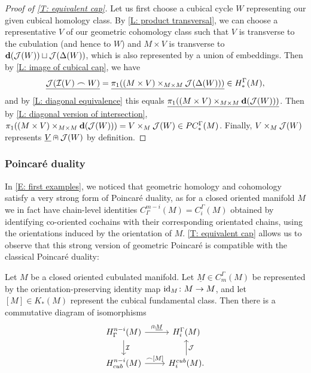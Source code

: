 \begin{proof}[Proof of \cref{T: equivalent cap}]
	Let us first choose a cubical cycle $W$ representing our given cubical homology class.
	By \cref{L: product transversal}, we can choose a representative $V$ of our geometric cohomology class such that $V$ is transverse to the cubulation (and hence to $W$) and $M \times V$ is transverse to $\mathbf{d}(\mathcal{J}(W)) \sqcup \mathcal{J}(\Delta(W))$, which is also represented by a union of embeddings.
	Then by \cref{L: image of cubical cap}, we have
	$$\underline{\mathcal{J}(\mathcal{I}(V)\frown W)} = \underline{\pi_1( (M \times V)\times_{M \times M}\mathcal{J}(\Delta(W)))} \in H_*^\Gamma(M),$$
	and by \cref{L: diagonal equivalence} this equals $\underline{\pi_1((M \times V)\times_{M \times M} \mathbf{d}(\mathcal{J}(W)))}$.
	Then by \cref{L: diagonal version of intersection},
	$\pi_1((M \times V)\times_{M \times M} \mathbf{d}(\mathcal{J}(W))) = V \times_M \mathcal{J}(W) \in PC_*^\Gamma(M)$.
	Finally, $V \times_M \mathcal{J}(W)$ represents $\underline{V}\nplus \mathcal{J}(W)$ by definition.
\end{proof}

\subsubsection{Poincar\'e duality}\label{S: PD}

In \cref{E: first examples}, we noticed that geometric homology and cohomology satisfy a very strong form of Poincar\'e duality, as for a closed oriented manifold $M$ we in fact have chain-level identities $C^{m-i}_\Gamma(M) = C_i^\Gamma(M)$ obtained by identifying co-oriented cochains with their corresponding orientated chains, using the orientations induced by the orientation of $M$.
\cref{T: equivalent cap} allows us to observe that this strong version of geometric Poincar\'e is compatible with the classical Poincar\'e duality:

\begin{corollary}\label{C: PD}
	Let $M$ be a closed oriented cubulated manifold.
	Let $\underline M \in C_m^\Gamma(M)$ be represented by the orientation-preserving identity map $\mathrm{id}_M \colon M \to M$, and let $[M] \in K_*(M)$ represent the cubical fundamental class.
	Then there is a commutative diagram of isomorphisms
	\[
	\begin{tikzcd}
		H^{n-i}_\Gamma(M) \arrow{r}{\nplus \uM} \arrow[d, "\mc I"] & H_i^\Gamma(M) \\
		H^{n-i}_{cub}(M) \arrow{r}{\frown [M]} & H_i^{cub}(M). \arrow[u, "\mc J"']
	\end{tikzcd}
	\]
\end{corollary}


